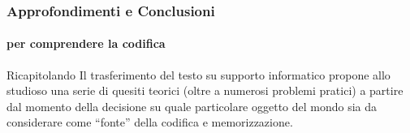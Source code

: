 









\begin{frame}
	\frametitle{Approfondimenti e Conclusioni}
	\framesubtitle{per comprendere la codifica}
	\addtocounter{nframe}{1}

	\begin{block}{Ricapitolando}
		Il trasferimento del testo su supporto informatico propone allo studioso una serie di quesiti teorici (oltre a numerosi problemi pratici) a partire dal momento della decisione su quale particolare oggetto del mondo sia da considerare come ``fonte'' della codifica e memorizzazione.
     \end{block}
     
   
\end{frame}

